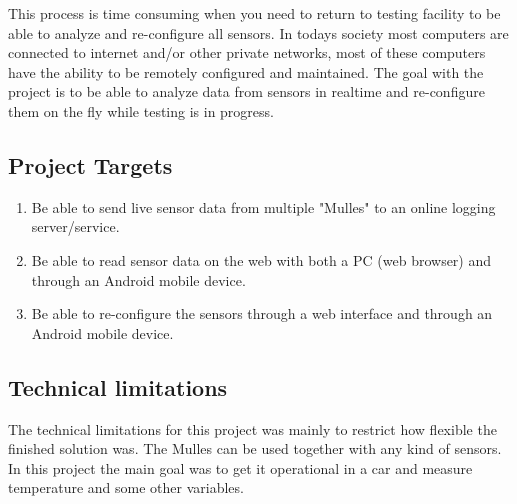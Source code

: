 This process is time consuming when you need to return to testing facility to be able to analyze and re-configure all sensors.
In todays society most computers are connected to internet and/or other private networks, most of these computers have the ability to be remotely configured and maintained.
The goal with the project is to be able to analyze data from sensors in realtime and re-configure them on the fly while testing is in progress.
\subsection{Project Targets}
\begin{enumerate}
\item Be able to send live sensor data from multiple "Mulles" to an online logging server/service.
\item Be able to read sensor data on the web with both a PC (web browser) and through an Android mobile device.
\item Be able to re-configure the sensors through a web interface and through an Android mobile device.
\end{enumerate}

\subsection{Technical limitations}
The technical limitations for this project was mainly to restrict how flexible the finished solution was.
The Mulles can be used together with any kind of sensors.
In this project the main goal was to get it operational in a car and measure temperature and some other variables.


